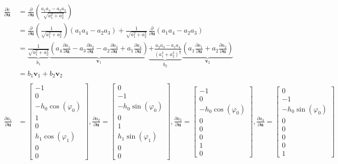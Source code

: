 \begin{align*}
\frac{\partial e}{\partial \boldsymbol{u}} &= \frac{\partial}{\partial \boldsymbol{u}}\left(\frac{a_1 a_4 - a_2 a_3}{\sqrt{a_1^2 + a_2^2}}\right)\\
&= \frac{\partial}{\partial \boldsymbol{u}}\left(\frac{1}{\sqrt{a_1^2 + a_2^2}}\right)\left(a_1 a_4 - a_2 a_3\right) + \frac{1}{\sqrt{a_1^2 + a_2^2}}\,\frac{\partial}{\partial \boldsymbol{u}}\left(a_1 a_4 - a_2 a_3\right)\\
&=
\underbrace{\frac{1}{\sqrt{a_1^2 + a_2^2}}}_{b_1} \underbrace{\left(a_4\frac{\partial a_1}{\partial \boldsymbol{u}} - a_3\frac{\partial a_2}{\partial \boldsymbol{u}} - a_2\frac{\partial a_3}{\partial \boldsymbol{u}} + a_1\frac{\partial a_4}{\partial \boldsymbol{u}}\right)}_{\boldsymbol{v}_1}
\underbrace{+\frac{a_2 a_3 - a_1 a_4}{(a_1^2 + a_2^2)^\frac{3}{2}}}_{b_2}
\underbrace{\left(a_1\frac{\partial a_1}{\partial \boldsymbol{u}} + a_2\frac{\partial a_2}{\partial \boldsymbol{u}}\right)}_{\boldsymbol{v}_2}\\
&= b_1\boldsymbol{v}_1 + b_2\boldsymbol{v}_2\\
\\
\frac{\partial a_1}{\partial \boldsymbol{u}} &=
\begin{bmatrix}
-1\\ 0\\ -h_0 \cos(\varphi_0)\\ 1\\ 0\\ h_1 \cos(\varphi_1)\\ 0\\ 0
\end{bmatrix},
\frac{\partial a_2}{\partial \boldsymbol{u}} =
\begin{bmatrix}
0\\ -1\\ -h_0 \sin(\varphi_0)\\ 0\\ 1\\ h_1 \sin(\varphi_1)\\ 0\\ 0
\end{bmatrix},
\frac{\partial a_3}{\partial \boldsymbol{u}} =
\begin{bmatrix}
-1\\ 0\\ -h_0 \cos(\varphi_0)\\ 0\\ 0\\ 0\\ 1\\ 0
\end{bmatrix},
\frac{\partial a_4}{\partial \boldsymbol{u}} =
\begin{bmatrix}
0\\ -1\\ -h_0 \sin(\varphi_0)\\ 0\\ 0\\ 0\\ 0\\ 1
\end{bmatrix}
\end{align*}


